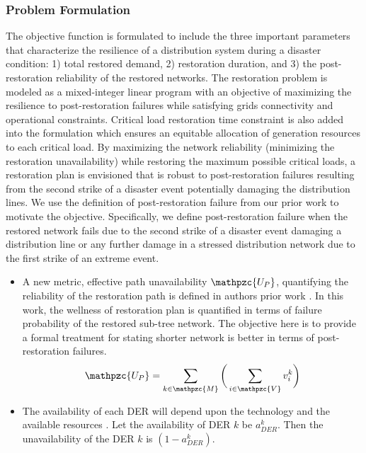 \documentclass[12pt]{article}
\begin{document}
\subsubsection{Problem Formulation}
The objective function is formulated to include the three important parameters that characterize the resilience of a distribution system during a disaster condition: 1) total restored demand, 2) restoration duration, and 3) the post-restoration reliability of the restored networks. The restoration problem is modeled as a mixed-integer linear program with an objective of maximizing the resilience to post-restoration failures while satisfying grids connectivity and operational constraints. Critical load restoration time constraint is also added into the formulation which ensures an equitable allocation of generation resources to each critical load.
By maximizing the network reliability (minimizing the restoration unavailability) while restoring the maximum possible critical loads, a restoration plan is envisioned that is robust to post-restoration failures resulting from the second strike of a disaster event potentially damaging the distribution lines. We use the definition of post-restoration failure from our prior work \cite{8274597} to motivate the objective. Specifically, we define post-restoration failure when the restored network fails due to the second strike of a disaster event damaging a distribution line or any further damage in a stressed distribution network due to the first strike of an extreme event.

\begin{itemize}
    \item A new metric, effective path unavailability $\mathpzc{U_P}$, quantifying the reliability of the restoration path is defined in authors prior work \cite{8274597}.  In this work, the wellness of restoration plan is quantified in terms of failure probability of the restored sub-tree network. The objective here is to provide a formal treatment for stating shorter network is better in terms of post-restoration failures.
    \begin{equation}\label{eq:1}
    \mathpzc{U_P} = \sum_{k\in \mathpzc{M}}^{}\bigg(\sum_{i\in\mathpzc{V}}^{}v_i^k \bigg)
    \end{equation}
    \item The availability of each DER will depend upon the technology and the available resources \cite{6202397}. Let the availability of DER $k$ be $a_{DER}^k$. Then the unavailability of the DER $k$ is $(1- a_{DER}^k)$.
\end{itemize}
\end{document}
